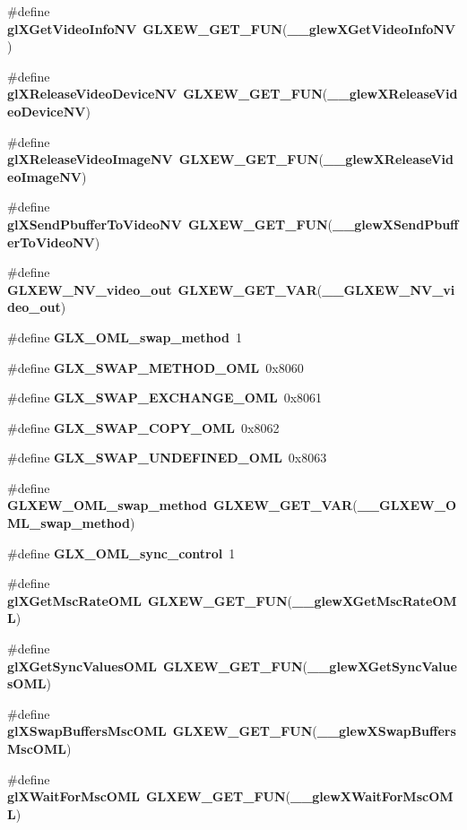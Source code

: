 \begin{DoxyCompactItemize}
\#define {\bf gl\+X\+Get\+Video\+Info\+NV}~{\bf G\+L\+X\+E\+W\+\_\+\+G\+E\+T\+\_\+\+F\+UN}({\bf \+\_\+\+\_\+glew\+X\+Get\+Video\+Info\+NV})
\item 
\#define {\bf gl\+X\+Release\+Video\+Device\+NV}~{\bf G\+L\+X\+E\+W\+\_\+\+G\+E\+T\+\_\+\+F\+UN}({\bf \+\_\+\+\_\+glew\+X\+Release\+Video\+Device\+NV})
\item 
\#define {\bf gl\+X\+Release\+Video\+Image\+NV}~{\bf G\+L\+X\+E\+W\+\_\+\+G\+E\+T\+\_\+\+F\+UN}({\bf \+\_\+\+\_\+glew\+X\+Release\+Video\+Image\+NV})
\item 
\#define {\bf gl\+X\+Send\+Pbuffer\+To\+Video\+NV}~{\bf G\+L\+X\+E\+W\+\_\+\+G\+E\+T\+\_\+\+F\+UN}({\bf \+\_\+\+\_\+glew\+X\+Send\+Pbuffer\+To\+Video\+NV})
\item 
\#define {\bf G\+L\+X\+E\+W\+\_\+\+N\+V\+\_\+video\+\_\+out}~{\bf G\+L\+X\+E\+W\+\_\+\+G\+E\+T\+\_\+\+V\+AR}({\bf \+\_\+\+\_\+\+G\+L\+X\+E\+W\+\_\+\+N\+V\+\_\+video\+\_\+out})
\item 
\#define {\bf G\+L\+X\+\_\+\+O\+M\+L\+\_\+swap\+\_\+method}~1
\item 
\#define {\bf G\+L\+X\+\_\+\+S\+W\+A\+P\+\_\+\+M\+E\+T\+H\+O\+D\+\_\+\+O\+ML}~0x8060
\item 
\#define {\bf G\+L\+X\+\_\+\+S\+W\+A\+P\+\_\+\+E\+X\+C\+H\+A\+N\+G\+E\+\_\+\+O\+ML}~0x8061
\item 
\#define {\bf G\+L\+X\+\_\+\+S\+W\+A\+P\+\_\+\+C\+O\+P\+Y\+\_\+\+O\+ML}~0x8062
\item 
\#define {\bf G\+L\+X\+\_\+\+S\+W\+A\+P\+\_\+\+U\+N\+D\+E\+F\+I\+N\+E\+D\+\_\+\+O\+ML}~0x8063
\item 
\#define {\bf G\+L\+X\+E\+W\+\_\+\+O\+M\+L\+\_\+swap\+\_\+method}~{\bf G\+L\+X\+E\+W\+\_\+\+G\+E\+T\+\_\+\+V\+AR}({\bf \+\_\+\+\_\+\+G\+L\+X\+E\+W\+\_\+\+O\+M\+L\+\_\+swap\+\_\+method})
\item 
\#define {\bf G\+L\+X\+\_\+\+O\+M\+L\+\_\+sync\+\_\+control}~1
\item 
\#define {\bf gl\+X\+Get\+Msc\+Rate\+O\+ML}~{\bf G\+L\+X\+E\+W\+\_\+\+G\+E\+T\+\_\+\+F\+UN}({\bf \+\_\+\+\_\+glew\+X\+Get\+Msc\+Rate\+O\+ML})
\item 
\#define {\bf gl\+X\+Get\+Sync\+Values\+O\+ML}~{\bf G\+L\+X\+E\+W\+\_\+\+G\+E\+T\+\_\+\+F\+UN}({\bf \+\_\+\+\_\+glew\+X\+Get\+Sync\+Values\+O\+ML})
\item 
\#define {\bf gl\+X\+Swap\+Buffers\+Msc\+O\+ML}~{\bf G\+L\+X\+E\+W\+\_\+\+G\+E\+T\+\_\+\+F\+UN}({\bf \+\_\+\+\_\+glew\+X\+Swap\+Buffers\+Msc\+O\+ML})
\item 
\#define {\bf gl\+X\+Wait\+For\+Msc\+O\+ML}~{\bf G\+L\+X\+E\+W\+\_\+\+G\+E\+T\+\_\+\+F\+UN}({\bf \+\_\+\+\_\+glew\+X\+Wait\+For\+Msc\+O\+ML})

\end{DoxyCompactItemize}
